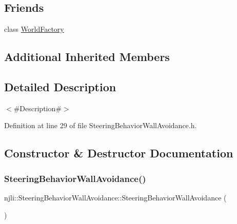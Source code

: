 \subsection*{Friends}
\begin{DoxyCompactItemize}
\item 
class \mbox{\hyperlink{classnjli_1_1_steering_behavior_wall_avoidance_acb96ebb09abe8f2a37a915a842babfac}{World\+Factory}}
\end{DoxyCompactItemize}
\subsection*{Additional Inherited Members}


\subsection{Detailed Description}
$<$\#\+Description\#$>$ 

Definition at line 29 of file Steering\+Behavior\+Wall\+Avoidance.\+h.



\subsection{Constructor \& Destructor Documentation}
\mbox{\label{classnjli_1_1_steering_behavior_wall_avoidance_a6ba7e1aa0e5d8a88e90fb504bc255c28}} 
\subsubsection{\texorpdfstring{Steering\+Behavior\+Wall\+Avoidance()}{SteeringBehaviorWallAvoidance()}\hspace{0.1cm}{\footnotesize\ttfamily [1/3]}}
{\footnotesize\ttfamily njli\+::\+Steering\+Behavior\+Wall\+Avoidance\+::\+Steering\+Behavior\+Wall\+Avoidance (\begin{DoxyParamCaption}{ }\end{DoxyParamCaption})\hspace{0.3cm}{\ttfamily [protected]}}

